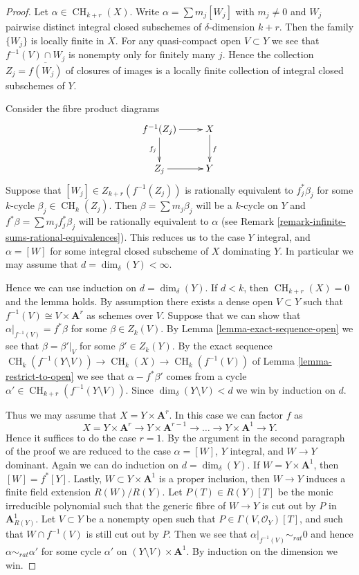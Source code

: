 \documentclass[10pt,a4paper]{amsart}
\theoremstyle{plain}
\theoremstyle{definition}
\theoremstyle{remark}
\numberwithin{equation}{subsection}
\def\CH{\mathop{\mathrm{CH}}\nolimits}
\begin{document}
\begin{proof}
Let $\alpha \in \CH_{k + r}(X)$.
Write $\alpha = \sum m_j[W_j]$ with $m_j \not = 0$ and
$W_j$ pairwise distinct integral closed subschemes of
$\delta$-dimension $k + r$. Then the family $\{W_j\}$
is locally finite in $X$. For any quasi-compact open
$V \subset Y$ we see that $f^{-1}(V) \cap W_j$
is nonempty only for finitely many $j$. Hence the
collection $Z_j = \overline{f(W_j)}$ of closures
of images is a locally finite collection of integral
closed subschemes of $Y$.

\medskip\noindent
Consider the fibre product diagrams
$$
\xymatrix{
f^{-1}(Z_j) \ar[r] \ar[d]_{f_j} & X \ar[d]^f \\
Z_j \ar[r] & Y
}
$$
Suppose that $[W_j] \in Z_{k + r}(f^{-1}(Z_j))$
is rationally equivalent to $f_j^*\beta_j$ for some
$k$-cycle $\beta_j \in \CH_k(Z_j)$. Then
$\beta = \sum m_j \beta_j$ will be a $k$-cycle on $Y$
and $f^*\beta = \sum m_j f_j^*\beta_j$ will be rationally
equivalent to $\alpha$ (see
Remark \ref{remark-infinite-sums-rational-equivalences}).
This reduces us to the case $Y$ integral, and
$\alpha = [W]$ for some integral closed subscheme
of $X$ dominating $Y$. In particular we may
assume that $d = \dim_\delta(Y) < \infty$.

\medskip\noindent
Hence we can use induction on $d = \dim_\delta(Y)$.
If $d < k$, then $\CH_{k + r}(X) = 0$ and the lemma holds.
By assumption there exists a dense open $V \subset Y$ such
that $f^{-1}(V) \cong V \times \mathbf{A}^r$ as schemes over $V$.
Suppose that we can show that $\alpha|_{f^{-1}(V)} = f^*\beta$
for some $\beta \in Z_k(V)$. By Lemma \ref{lemma-exact-sequence-open}
we see that
$\beta = \beta'|_V$ for some $\beta' \in Z_k(Y)$.
By the exact sequence
$\CH_k(f^{-1}(Y \setminus V)) \to \CH_k(X) \to \CH_k(f^{-1}(V))$
of Lemma \ref{lemma-restrict-to-open}
we see that $\alpha - f^*\beta'$ comes from
a cycle $\alpha' \in \CH_{k + r}(f^{-1}(Y \setminus V))$.
Since $\dim_\delta(Y \setminus V) < d$ we win by
induction on $d$.

\medskip\noindent
Thus we may assume that $X = Y \times \mathbf{A}^r$.
In this case we can factor $f$ as
$$
X = Y \times \mathbf{A}^r \to
Y \times \mathbf{A}^{r - 1} \to \ldots \to
Y \times \mathbf{A}^1 \to Y.
$$
Hence it suffices to do the case $r = 1$. By the argument in the
second paragraph of the proof we are reduced to the case
$\alpha = [W]$, $Y$ integral, and $W \to Y$ dominant.
Again we can do induction on $d = \dim_\delta(Y)$.
If $W = Y \times \mathbf{A}^1$, then $[W] = f^*[Y]$.
Lastly, $W \subset Y \times \mathbf{A}^1$ is a proper inclusion,
then $W \to Y$ induces a finite field extension $R(W)/R(Y)$.
Let $P(T) \in R(Y)[T]$ be the monic irreducible polynomial such
that the generic fibre of $W \to Y$ is cut out by $P$ in
$\mathbf{A}^1_{R(Y)}$. Let $V \subset Y$ be a nonempty open such
that $P \in \Gamma(V, \mathcal{O}_Y)[T]$, and such that
$W \cap f^{-1}(V)$ is still cut out by $P$. Then we see that
$\alpha|_{f^{-1}(V)} \sim_{rat} 0$ and hence $\alpha \sim_{rat} \alpha'$
for some cycle $\alpha'$ on $(Y \setminus V) \times \mathbf{A}^1$.
By induction on the dimension we win.
\end{proof}
\end{document}
